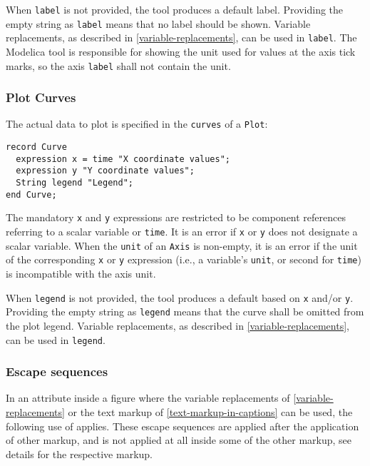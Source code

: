 When \lstinline!label! is not provided, the tool produces a default label.
Providing the empty string as \lstinline!label! means that no label should be shown.
Variable replacements, as described in \cref{variable-replacements}, can be used in \lstinline!label!.
The Modelica tool is responsible for showing the unit used for values at the axis tick marks, so the axis \lstinline!label! shall not contain the unit.

\subsubsection{Plot Curves}\label{plot-curves}

The actual data to plot is specified in the \lstinline!curves! of a \lstinline!Plot!:
\begin{lstlisting}[language=modelica]
record Curve
  expression x = time "X coordinate values";
  expression y "Y coordinate values";
  String legend "Legend";
end Curve;
\end{lstlisting}

The mandatory \lstinline!x! and \lstinline!y! expressions are restricted to be component references referring to a scalar variable or \lstinline!time!.
It is an error if \lstinline!x! or \lstinline!y! does not designate a scalar variable.
When the \lstinline!unit! of an \lstinline!Axis! is non-empty, it is an error if the unit of the corresponding \lstinline!x! or \lstinline!y! expression (i.e., a variable's \lstinline!unit!, or second for \lstinline!time!) is incompatible with the axis unit.

When \lstinline!legend! is not provided, the tool produces a default based on \lstinline!x! and/or \lstinline!y!.
Providing the empty string as \lstinline!legend! means that the curve shall be omitted from the plot legend.
Variable replacements, as described in \cref{variable-replacements}, can be used in \lstinline!legend!.

\subsubsection{Escape sequences}\label{text-markup-escape-sequences}

In an attribute inside a figure where the variable replacements of \cref{variable-replacements} or the text markup of \cref{text-markup-in-captions} can be used, the following use of  applies.
These escape sequences are applied after the application of other markup, and is not applied at all inside some of the other markup, see details for the respective markup.

